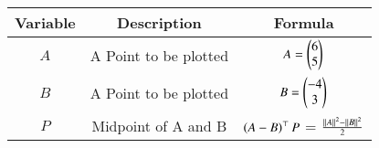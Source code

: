 \begin{center}
    \begin{tabular}{|c|c|c|} 
        \hline
            \textbf{Variable} & \textbf{Description} & \textbf{Formula} \\ 
        \hline
            $A$   & A Point to be plotted & $A = \begin{pmatrix}6 \\ 5\end{pmatrix}$ \\ 
        \hline
            $B$   &  A Point to be plotted &  $B = \begin{pmatrix}-4 \\ 3\end{pmatrix}$\\ 
        \hline
            $P$   & Midpoint of  A and B & $\left(A-B\right)^\top P$ = $\frac{\left\vert\left\vert A\right\vert\right\vert^2-\left\vert\left\vert B\right\vert\right\vert^2}{2}$\\
        \hline
    \end{tabular}
\end{center}  
